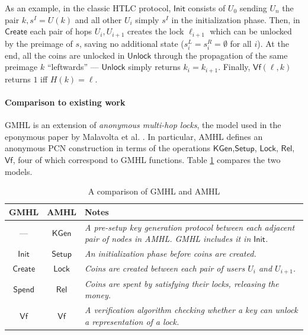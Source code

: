 \documentclass[USenglish,oneside,twocolumn]{article}
\begin{document}
As an example, in the classic HTLC protocol, $\mathsf{Init}$ consists of $U_0$ sending $U_n$ the pair $k,s^I=U(k)$ and all other $U_i$ simply $s^I$ in the initialization phase. Then, in $\mathsf{Create}$ each pair of hops $U_i,U_{i+1}$ creates the lock $\ell_{i+1}$ which can be unlocked by the preimage of $s$, saving no additional state ($s^L_i = s^R_i = \emptyset$ for all $i$). At the end, all the coins are unlocked in $\mathsf{Unlock}$ through the propagation of the same preimage $k$ ``leftwards'' --- $\mathsf{Unlock}$ simply returns $k_i = k_{i+1}$. Finally, $\mathsf{Vf}(\ell,k)$ returns $1$ iff $H(k) = \ell$.

\paragraph*{Comparison to existing work}

GMHL is an extension of \emph{anonymous multi-hop locks}, the model used in the eponymous paper by Malavolta et al. \cite{malavolta2019anonymous}. In particular, AMHL defines an anonymous PCN construction in terms of the operations $\mathsf{KGen}$,$\mathsf{Setup}$, $\mathsf{Lock}$, $\mathsf{Rel}$, $\mathsf{Vf}$, four of which correspond to GMHL functions. Table \ref{tab:gmhlamhl} compares the two models.

\begin{table}[h]
    \centering
    \caption{A comparison of GMHL and AMHL}
    \begin{tabular}{c c p{5cm}}
        GMHL              & AMHL             & Notes                                                                                                                        \\
        \midrule
        ---               & $\mathsf{KGen}$  & \emph{A pre-setup key generation protocol between each adjacent pair of nodes in AMHL. GMHL includes it in $\mathsf{Init}$.} \\
        $\mathsf{Init}$   & $\mathsf{Setup}$ & \emph{An initialization phase before coins are created.}                                                                     \\
        $\mathsf{Create}$ & $\mathsf{Lock}$  & \emph{Coins are created between each pair of users $U_{i}$ and $U_{i+1}$.}                                                   \\
        $\mathsf{Spend}$  & $\mathsf{Rel}$   & \emph{Coins are spent by satisfying their locks, releasing the money.}                                                       \\
        $\mathsf{Vf}$     & $\mathsf{Vf}$    & \emph{A verification algorithm checking whether a key can unlock a representation of a lock.}                                \\
    \end{tabular}
    \label{tab:gmhlamhl}
\end{table}
\end{document}
